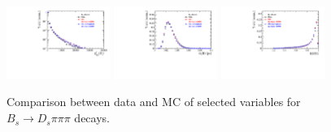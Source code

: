 \begin{figure}[h]
\includegraphics[height=!,width=0.3\textwidth]{figs/dataVsMC/norm_final/Ds2all_Ds_FDCHI2_ORIVX.pdf}
\includegraphics[height=!,width=0.3\textwidth]{figs/dataVsMC/norm_final/Ds2all_Bs_BsDTF_TAUERR.pdf}
\includegraphics[height=!,width=0.3\textwidth]{figs/dataVsMC/norm_final/Ds2all_BDTG_response.pdf}


\caption{\footnotesize Comparison between data and MC of selected variables for $B_s\to D_s\pi\pi\pi$ decays.}
\label{fig:}

%
%
%
%
%




\end{figure}
